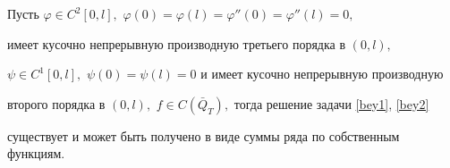 \smallskip



\begin{theorem}[2]%

Пусть $\varphi \in C^2[0, l],$ $\varphi(0)=\varphi(l)=\varphi''(0)=\varphi''(l)=0,$

имеет кусочно непрерывную производную третьего порядка в $(0, l),$

$\psi \in C^1[0, l],$ $\psi(0)=\psi(l)=0 $ и имеет кусочно непрерывную производную

второго порядка в $(0, l),$ $f\in C(\bar{Q}_T),$ тогда решение задачи \rm  \eqref{bey1}, \eqref{bey2} \it

существует и может быть получено в виде суммы ряда по собственным функциям\rm.

\end{theorem}



\smallskip




